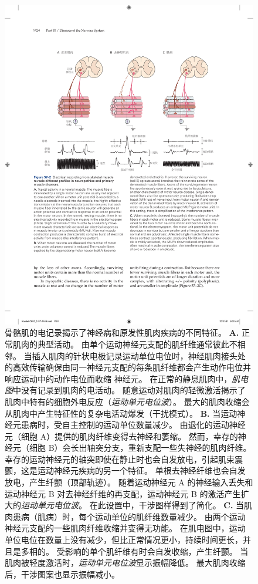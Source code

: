 \begin{figure}[htbp]
	\centering
	\includegraphics[width=1.0\linewidth]{chap57/fig_57_2}
	\caption{骨骼肌的电记录揭示了神经病和原发性肌肉疾病的不同特征。
		\textbf{A.} 正常肌肉的典型活动。
		由单个运动神经元支配的肌纤维通常彼此不相邻。
		当插入肌肉的针状电极记录运动单位电位时，神经肌肉接头处的高效传输确保由同一神经元支配的每条肌纤维都会产生动作电位并响应运动中的动作电位而收缩 神经元。
		在正常的静息肌肉中，\textit{肌电图}中没有记录到肌肉的电活动。
		随意运动对肌肉的轻微激活揭示了肌肉中特有的细胞外电反应（\textit{运动单元电位波}）。
		最大的肌肉收缩会从肌肉中产生特征性的复杂电活动爆发（干扰模式）。
		\textbf{B.} 当运动神经元患病时，受自主控制的运动单位数量减少。
		由退化的运动神经元（细胞 A）提供的肌肉纤维变得去神经和萎缩。
		然而，幸存的神经元（细胞 B）会长出轴突分支，重新支配一些失神经的肌肉纤维。
		幸存的运动神经元的轴突即使在静止时也会自发放电，引起肌束震颤，这是运动神经元疾病的另一个特征。
		单根去神经纤维也会自发放电，产生纤颤（顶部轨迹）。
		随着运动神经元 A 的神经输入丢失和运动神经元 B 对去神经纤维的再支配，运动神经元 B 的激活产生扩大的\textit{运动单元电位波}。
		在此设置中，干涉图样得到了简化。
		\textbf{C.} 当肌肉患病（肌病）时，每个运动单位的肌纤维数量减少。 由两个运动神经元支配的一些肌肉纤维收缩并变得无功能。
		在肌电图中，运动单位电位在数量上没有减少，但比正常情况更小，持续时间更长，并且是多相的。
		受影响的单个肌纤维有时会自发收缩，产生纤颤。
		当肌肉被轻度激活时，\textit{运动单元电位波}显示振幅降低。
		最大肌肉收缩后，干涉图案也显示振幅减小。}
	\label{fig:57_2}
\end{figure}


